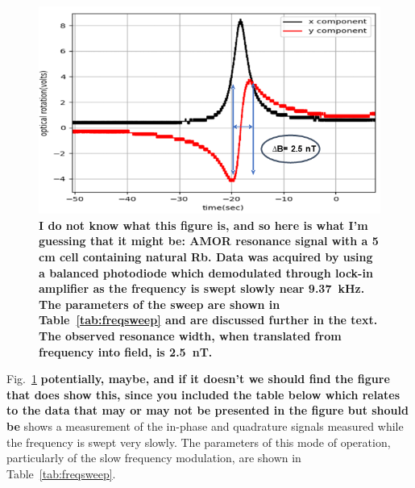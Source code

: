\begin{figure}[h]
\centering\includegraphics[width=0.7\linewidth]{figures/AM_NMOR}
\caption{\bf I do not know what this figure is, and so here is what
  I'm guessing that it might be: AMOR resonance signal with a 5 cm
  cell containing natural Rb.  Data was acquired by using a balanced
  photodiode which demodulated through lock-in amplifier as the
  frequency is swept slowly near 9.37~kHz.  The parameters of the
  sweep are shown in Table~\ref{tab:freqsweep} and are discussed
  further in the text. The observed resonance width, when translated
  from frequency into field, is 2.5~nT.\label{fig:AMOR}}
\end{figure} 

Fig.~\ref{fig:AMOR} {\bf potentially, maybe, and if it doesn't we
  should find the figure that does show this, since you included the
  table below which relates to the data that may or may not be
  presented in the figure but should be} shows a measurement of the
in-phase and quadrature signals measured while the frequency is swept
very slowly.  The parameters of this mode of operation, particularly
of the slow frequency modulation, are shown in
Table~\ref{tab:freqsweep}.

